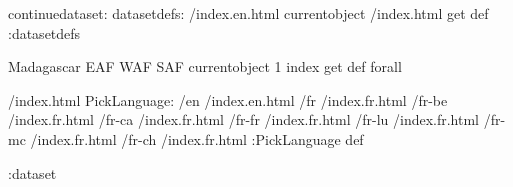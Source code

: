 \begin{ingrid}
continuedataset:
datasetdefs:
/index.en.html currentobject /index.html get def
:datasetdefs

{ Madagascar EAF WAF SAF } { currentobject 1 index get def } forall

/index.html {
PickLanguage:
/en /index.en.html
/fr /index.fr.html
/fr-be /index.fr.html
/fr-ca /index.fr.html
/fr-fr /index.fr.html
/fr-lu /index.fr.html
/fr-mc /index.fr.html
/fr-ch /index.fr.html
:PickLanguage
} def

:dataset
\end{ingrid}

